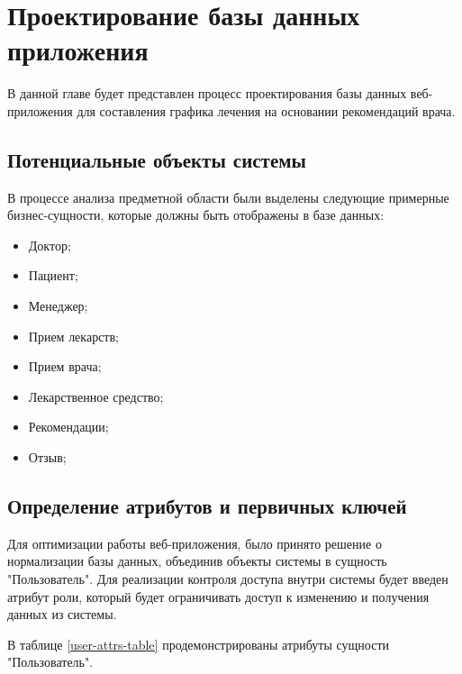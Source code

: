 \documentclass[14pt]{extreport}
\begin{document}
\chapter{Проектирование базы данных приложения}

        В данной главе будет представлен процесс проектирования базы данных %
        веб-приложения для составления графика лечения на основании рекомендаций %
        врача.
        
    \section{Потенциальные объекты системы}
        В процессе анализа предметной области были выделены следующие примерные %
        бизнес-сущности, которые должны быть отображены в базе данных:

        \begin{itemize}
            \item Доктор;
            \item Пациент;
            \item Менеджер;
            \item Прием лекарств;
            \item Прием врача;
            \item Лекарственное средство;
            \item Рекомендации;
            \item Отзыв;
        \end{itemize}

    \section{Определение атрибутов и первичных ключей}

        Для оптимизации работы веб-приложения, было принято решение о %
        нормализации базы данных, объединив объекты системы в сущность "Пользователь". %
        Для реализации контроля доступа внутри системы будет введен атрибут роли, %
        который будет ограничивать доступ к изменению и получения данных из системы. %

        В таблице \ref{user-attrs-table} продемонстрированы атрибуты сущности "Пользователь".
\end{document}
